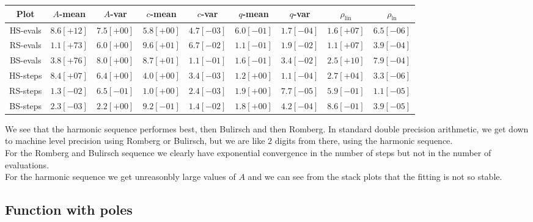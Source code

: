 \begin{table}[H]
    \centering
    \small
    \begin{tabular}{c||c|c|c|c|c|c|c|c}
Plot & \(A\)-mean & \(A\)-var & \(c\)-mean & \(c\)-var & \(q\)-mean & \(q\)-var & \(\rho_{\operatorname{lin}}\) & \(\rho_{\ln}\)\\\hline
\rowcolor{yellow}
HS-evals & \(8.6[+12]\) & \(7.5[+00]\) & \(5.8[+00]\) & \(4.7[-03]\) & \(6.0[-01]\) & \(1.7[-04]\) & \(1.6[+07]\) & \(6.5[-06]\) \\
\rowcolor{red}
RS-evals & \(1.1[+73]\) & \(6.0[+00]\) & \(9.6[+01]\) & \(6.7[-02]\) & \(1.1[-01]\) & \(1.9[-02]\) & \(1.1[+07]\) & \(3.9[-04]\) \\
\rowcolor{red}
BS-evals & \(3.8[+76]\) & \(8.0[+00]\) & \(8.7[+01]\) & \(1.1[-01]\) & \(1.6[-01]\) & \(3.4[-02]\) & \(2.5[+10]\) & \(7.9[-04]\) \\
\rowcolor{yellow}
HS-steps & \(8.4[+07]\) & \(6.4[+00]\) & \(4.0[+00]\) & \(3.4[-03]\) & \(1.2[+00]\) & \(1.1[-04]\) & \(2.7[+04]\) & \(3.3[-06]\) \\
\rowcolor{green}
RS-steps & \(1.3[-02]\) & \(6.5[-01]\) & \(1.0[+00]\) & \(2.4[-03]\) & \(1.9[+00]\) & \(7.7[-05]\) & \(5.9[-01]\) & \(1.1[-05]\) \\
\rowcolor{green}
BS-steps & \(2.3[-03]\) & \(2.2[+00]\) & \(9.2[-01]\) & \(1.4[-02]\) & \(1.8[+00]\) & \(4.2[-04]\) & \(8.6[-01]\) & \(3.9[-05]\) \\
    \end{tabular}
    \label{tab:my_label}
\end{table}

We see that the harmonic sequence performes best, then Bulirsch and then Romberg. In standard double precision arithmetic, we get down to machine level precision using Romberg or Bulirsch, but we are like \(2\) digits from there, using the harmonic sequence.\\

For the Romberg and Bulirsch sequence we clearly have exponential convergence in the number of steps but not in the number of evaluations.\\

For the harmonic sequence we get unreasonbly large values of \(A\) and we can see from the stack plots that the fitting is not so stable.\\

\subsection{Function with poles}


